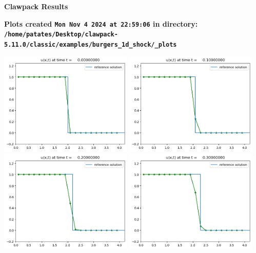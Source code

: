\documentclass[11pt]{article}
\begin{document}
        \begin{center}{\Large\bf Clawpack Results}\vskip 5pt
        
        \bf Plots created {\tt Mon Nov  4 2024 at 22:59:06} in directory: \vskip 5pt
        \verb+/home/patates/Desktop/clawpack-5.11.0/classic/examples/burgers_1d_shock/_plots+
        \end{center}
        \vskip 5pt
        \includegraphics[width=0.475\textwidth]{frame0000fig0.png}
\vskip 10pt 
\includegraphics[width=0.475\textwidth]{frame0001fig0.png}
\vskip 10pt 
\includegraphics[width=0.475\textwidth]{frame0002fig0.png}
\vskip 10pt 
\includegraphics[width=0.475\textwidth]{frame0003fig0.png}
\end{document}
